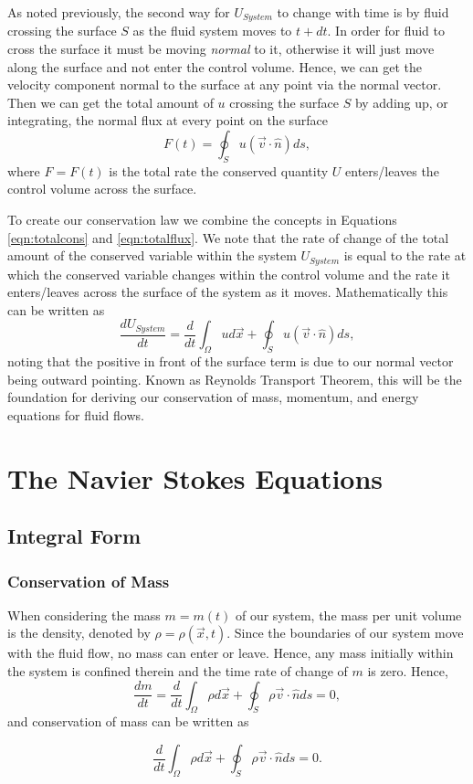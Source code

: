 As noted previously, the second way for $U_{System}$ to change with time is by fluid crossing the surface $S$ as the fluid system moves to $t+dt$. In order for fluid to cross the surface it must be moving {\it normal} to it, otherwise it will just move along the surface and not enter the control volume. Hence, we can get the velocity component normal to the surface at any point via the normal vector. Then we can get the total amount of $u$ crossing the surface $S$ by adding up, or integrating, the normal flux at every point on the surface
\begin{equation}
	\label{eqn:totalflux}
	F(t) = \oint_S u (\vec{v} \cdot \hat{n}) ds,
\end{equation}
where $F = F(t)$ is the total rate the conserved quantity $U$ enters/leaves the control volume across the surface.

To create our conservation law we combine the concepts in Equations \ref{eqn:totalcons} and \ref{eqn:totalflux}. We note that the rate of change of the total amount of the conserved variable within the system $U_{System}$ is equal to the rate at which the conserved variable changes within the control volume and the rate it enters/leaves across the surface of the system as it moves. Mathematically this can be written as
\begin{equation}
	\frac{dU_{System}}{dt} = \frac{d}{dt}\int_\Omega u d\vec{x} + \oint_S u (\vec{v} \cdot \hat{n}) ds,
\end{equation}
noting that the positive in front of the surface term is due to our normal vector being outward pointing. Known as Reynolds Transport Theorem, this will be the foundation for deriving our conservation of mass, momentum, and energy equations for fluid flows.

\chapter{The Navier Stokes Equations}

\section{Integral Form}
\subsection{Conservation of Mass}
When considering the mass $m = m(t)$ of our system, the mass per unit volume is the density, denoted by $\rho = \rho(\vec{x},t)$. Since the boundaries of our system move with the fluid flow, no mass can enter or leave. Hence, any mass initially within the system is confined therein and the time rate of change of $m$ is zero. Hence,
\begin{equation}
	\frac{dm}{dt} = \frac{d}{dt}\int_\Omega \rho d\vec{x} + \oint_S \rho \vec{v} \cdot \hat{n} ds = 0,
\end{equation}
and conservation of mass can be written as
\begin{eqBox}
\begin{equation}
	\frac{d}{dt}\int_\Omega \rho d\vec{x} + \oint_S \rho \vec{v} \cdot \hat{n} ds = 0.
\end{equation}
\end{eqBox}

